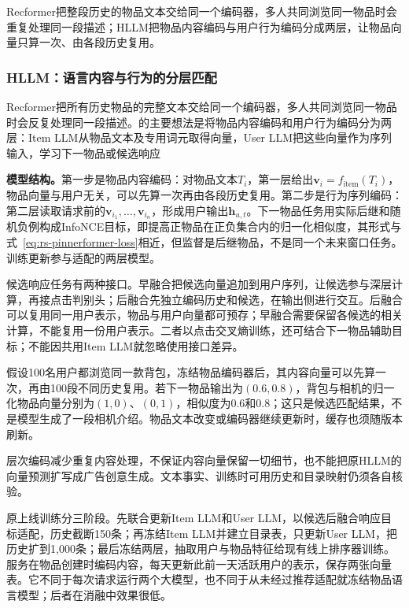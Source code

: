 Recformer把整段历史的物品文本交给同一个编码器，多人共同浏览同一物品时会重复处理同一段描述；HLLM把物品内容编码与用户行为编码分成两层，让物品向量只算一次、由各段历史复用。

\subsubsection{HLLM：语言内容与行为的分层匹配}
\label{sec:rs-hllm}

Recformer把所有历史物品的完整文本交给同一个编码器，多人共同浏览同一物品时会反复处理同一段描述。的主要想法是将物品内容编码和用户行为编码分为两层：Item LLM从物品文本及专用词元取得向量，User LLM把这些向量作为序列输入，学习下一物品或候选响应

\textbf{模型结构。}第一步是物品内容编码：对物品文本$T_i$，第一层给出$\bm{v}_i=f_{\mathrm{item}}(T_i)$，物品向量与用户无关，可以先算一次再由各段历史复用。第二步是行为序列编码：第二层读取请求前的$\bm{v}_{i_1},\ldots,\bm{v}_{i_n}$，形成用户输出$\bm{h}_{u,t}$。下一物品任务用实际后继和随机负例构成InfoNCE目标，即提高正物品在正负集合内的归一化相似度，其形式与式~\eqref{eq:rs-pinnerformer-loss}相近，但监督是后继物品，不是同一个未来窗口任务。训练更新参与适配的两层模型。

候选响应任务有两种接口。早融合把候选向量追加到用户序列，让候选参与深层计算，再接点击判别头；后融合先独立编码历史和候选，在输出侧进行交互。后融合可以复用同一用户表示，物品与用户向量都可预存；早融合需要保留各候选的相关计算，不能复用一份用户表示。二者以点击交叉熵训练，还可结合下一物品辅助目标；不能因共用Item LLM就忽略使用接口差异。

假设100名用户都浏览同一款背包，冻结物品编码器后，其内容向量可以先算一次，再由100段不同历史复用。若下一物品输出为$(0.6,0.8)$，背包与相机的归一化物品向量分别为$(1,0)$、$(0,1)$，相似度为0.6和0.8；这只是候选匹配结果，不是模型生成了一段相机介绍。物品文本改变或编码器继续更新时，缓存也须随版本刷新。

层次编码减少重复内容处理，不保证内容向量保留一切细节，也不能把原HLLM的向量预测扩写成广告创意生成。文本事实、训练时可用历史和目录映射仍须各自核验。

原上线训练分三阶段。先联合更新Item LLM和User LLM，以候选后融合响应目标适配，历史截断150条；再冻结Item LLM并建立目录表，只更新User LLM，把历史扩到1,000条；最后冻结两层，抽取用户与物品特征给现有线上排序器训练。服务在物品创建时编码内容，每天更新此前一天活跃用户的表示，保存两张向量表。它不同于每次请求运行两个大模型，也不同于从未经过推荐适配就冻结物品语言模型；后者在消融中效果很低。

